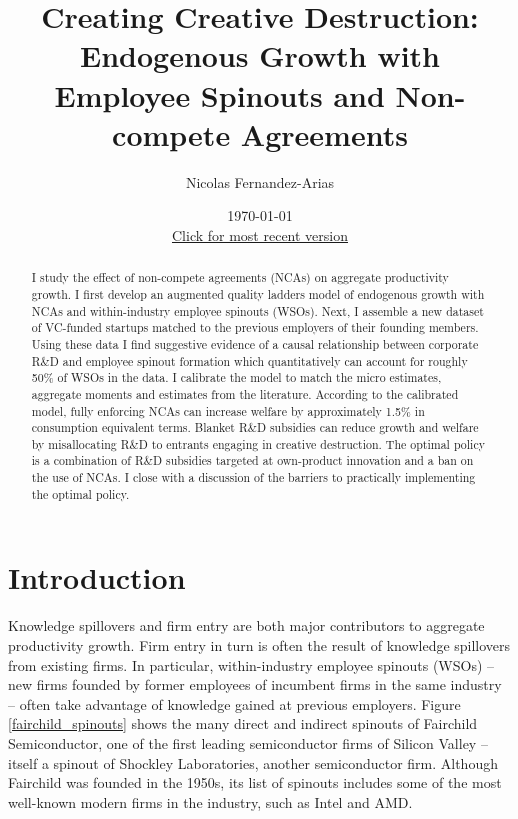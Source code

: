 \documentclass[11pt,english]{article}
\begin{document}
	
\title{Creating Creative Destruction: Endogenous Growth with Employee Spinouts and Non-compete Agreements}

\author{Nicolas Fernandez-Arias} 
\date{\today \\ \small
	\href{https://drive.google.com/file/d/1gu4CT1ft4LY4MsKKgluxb8Gu_YoP8DLD/view?usp=sharing}{Click for most recent version}}
\maketitle



\begin{abstract}
	I study the effect of non-compete agreements (NCAs) on aggregate productivity growth. I first develop an augmented quality ladders model of endogenous growth with NCAs and within-industry employee spinouts (WSOs). Next, I assemble a new dataset of VC-funded startups matched to the previous employers of their founding members. Using these data I find suggestive evidence of a causal relationship between corporate R\&D and employee spinout formation which quantitatively can account for roughly 50\% of WSOs in the data. I calibrate the model to match the micro estimates, aggregate moments and estimates from the literature. According to the calibrated model, fully enforcing NCAs can increase welfare by approximately 1.5\% in consumption equivalent terms. Blanket R\&D subsidies can reduce growth and welfare by misallocating R\&D to entrants engaging in creative destruction. The optimal policy is a combination of R\&D subsidies targeted at own-product innovation and a ban on the use of NCAs. I close with a discussion of the barriers to practically implementing the optimal policy.
\end{abstract}

\section{Introduction}

Knowledge spillovers and firm entry are both major contributors to aggregate productivity growth. Firm entry in turn is often the result of knowledge spillovers from existing firms. In particular, within-industry employee spinouts (WSOs) -- new firms founded by former employees of incumbent firms in the same industry -- often take advantage of knowledge gained at previous employers. Figure \ref{fairchild_spinouts} shows the many direct and indirect spinouts of Fairchild Semiconductor, one of the first leading semiconductor firms of Silicon Valley -- itself a spinout of Shockley Laboratories, another semiconductor firm. Although Fairchild was founded in the 1950s, its list of spinouts includes some of the most well-known modern firms in the industry, such as Intel and AMD. 
\end{document}
